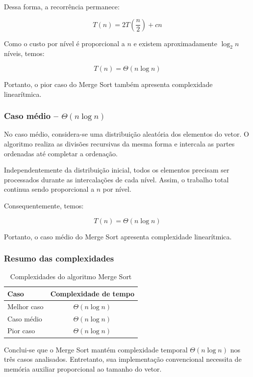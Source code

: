 Dessa forma, a recorrência permanece:

\begin{equation}
T(n) = 2T\left(\frac{n}{2}\right) + cn
\end{equation}

Como o custo por nível é proporcional a $n$ e existem
aproximadamente $\log_2 n$ níveis, temos:

\begin{equation}
T(n) = \Theta(n\log n)
\end{equation}

Portanto, o pior caso do Merge Sort também apresenta complexidade
linearítmica.

\subsubsection{Caso médio -- $\Theta(n\log n)$}

No caso médio, considera-se uma distribuição aleatória dos elementos
do vetor. O algoritmo realiza as divisões recursivas da mesma forma
e intercala as partes ordenadas até completar a ordenação.

Independentemente da distribuição inicial, todos os elementos precisam
ser processados durante as intercalações de cada nível. Assim, o
trabalho total continua sendo proporcional a $n$ por nível.

Consequentemente, temos:

\begin{equation}
T(n) = \Theta(n\log n)
\end{equation}

Portanto, o caso médio do Merge Sort apresenta complexidade
linearítmica.

\subsubsection{Resumo das complexidades}

\begin{table}[H]
    \centering
    \caption{Complexidades do algoritmo Merge Sort}
    \label{tab:complexidade-merge}
    \begin{tabular}{lc}
        \hline
        \textbf{Caso} & \textbf{Complexidade de tempo} \\
        \hline
        Melhor caso & $\Theta(n\log n)$ \\
        Caso médio & $\Theta(n\log n)$ \\
        Pior caso & $\Theta(n\log n)$ \\
        \hline
    \end{tabular}
\end{table}

\quad Conclui-se que o Merge Sort mantém complexidade temporal
$\Theta(n\log n)$ nos três casos analisados. Entretanto, sua
implementação convencional necessita de memória auxiliar proporcional
ao tamanho do vetor.
